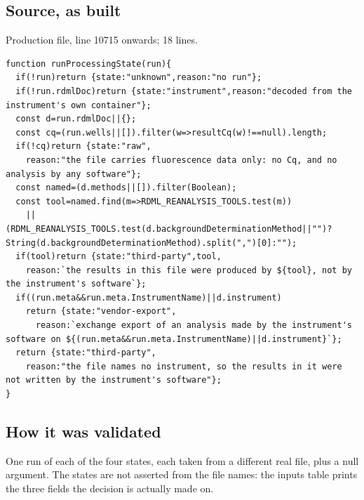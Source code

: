 \subsection*{Source, as built}
Production file, line 10715 onwards; 18 lines.
\begin{lstlisting}[style=js]
function runProcessingState(run){
  if(!run)return {state:"unknown",reason:"no run"};
  if(!run.rdmlDoc)return {state:"instrument",reason:"decoded from the instrument's own container"};
  const d=run.rdmlDoc||{};
  const cq=(run.wells||[]).filter(w=>resultCq(w)!==null).length;
  if(!cq)return {state:"raw",
    reason:"the file carries fluorescence data only: no Cq, and no analysis by any software"};
  const named=(d.methods||[]).filter(Boolean);
  const tool=named.find(m=>RDML_REANALYSIS_TOOLS.test(m))
    ||(RDML_REANALYSIS_TOOLS.test(d.backgroundDeterminationMethod||"")?String(d.backgroundDeterminationMethod).split(",")[0]:"");
  if(tool)return {state:"third-party",tool,
    reason:`the results in this file were produced by ${tool}, not by the instrument's software`};
  if((run.meta&&run.meta.InstrumentName)||d.instrument)
    return {state:"vendor-export",
      reason:`exchange export of an analysis made by the instrument's software on ${(run.meta&&run.meta.InstrumentName)||d.instrument}`};
  return {state:"third-party",
    reason:"the file names no instrument, so the results in it were not written by the instrument's software"};
}
\end{lstlisting}

\subsection*{How it was validated}
One run of each of the four states, each taken from a different real file, plus a null
argument. The states are not asserted from the file names: the inputs table prints the three fields
the decision is actually made on.

